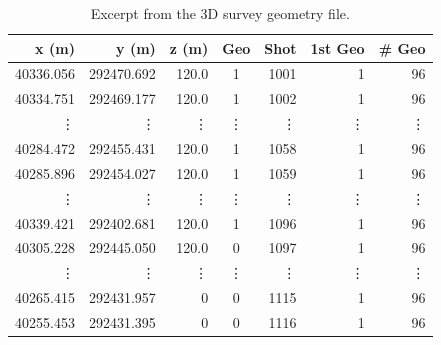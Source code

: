 \documentclass[a4paper,fleqn]{cas-sc}
\begin{document}
\begin{table}
   \caption{Excerpt from the 3D survey geometry file.}
    \centering
    \begin{tabular}{rrrcrrr}
        \toprule
        \textbf{x (m)} & \textbf{y (m)} & \textbf{z (m)} & \textbf{Geo} & \textbf{Shot} & \textbf{1st Geo} & \textbf{\# Geo} \\
        \midrule
        40336.056 & 292470.692 & 120.0 & 1 & 1001	 & 1 & 96 \\
        40334.751 & 292469.177 & 120.0 & 1 & 1002 & 	1 & 96 \\
        \vdots & \vdots & \vdots & \vdots & \vdots & \vdots & \vdots \\
		40284.472 & 292455.431 & 120.0 & 1 & 1058 & 1 & 96 \\
		40285.896 & 292454.027 & 120.0 & 1 & 1059 & 1 & 96 \\
        \vdots & \vdots & \vdots & \vdots & \vdots & \vdots & \vdots \\
        40339.421 & 292402.681 & 120.0 & 1 & 1096 & 1 & 96 \\
		40305.228 & 292445.050 & 120.0 & 0 & 1097 & 1 & 96 \\
        \vdots & \vdots & \vdots & \vdots & \vdots & \vdots & \vdots \\
        40265.415 & 292431.957 & 0 & 0 & 1115 & 1 & 96 \\
		40255.453 & 292431.395 & 0 & 0 & 1116 & 1 & 96 \\
        \bottomrule
    \end{tabular}
    \label{tab:3d_geometry}
\end{table}
\end{document}

